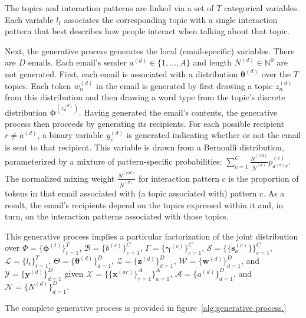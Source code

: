 \documentclass{pnastwo}
\newcommand{\bs}{\boldsymbol{s}}
\newcommand{\bw}{\boldsymbol{w}}
\newcommand{\bx}{\boldsymbol{x}}
\newcommand{\by}{\boldsymbol{y}}
\newcommand{\bz}{\boldsymbol{z}}
\newcommand{\bgamma}{\boldsymbol{\gamma}}
\newcommand{\bphi}{\boldsymbol{\phi}}
\newcommand{\btheta}{\boldsymbol{\theta}}
\begin{document}
\begin{article}
The topics and interaction patterns are linked via a set of $T$
categorical variables. Each variable $l_t$ associates the
corresponding topic with a single interaction pattern that best
describes how people interact when talking about that topic.

Next, the generative process generates the local (email-specific)
variables. There are $D$ emails. Each email's sender $a^{(d)} \in \{1,
\ldots, A\}$ and length $N^{(d)} \in \mathbb{N}^0$ are not
generated. First, each email is associated with a distribution
$\btheta^{(d)}$ over the $T$ topics. Each token $w_n^{(d)}$ in the
email is generated by first drawing a topic $z_n^{(d)}$ from this
distribution and then drawing a word type from the topic's discrete
distribution $\bphi^{(z_n^{(d)})}$. Having generated the email's
contents, the generative process then proceeds by generating its
recipients. For each possible recipient $r \neq a^{(d)}$, a binary
variable $y^{(d)}_r$ is generated indicating whether or not the email
is sent to that recipient. This variable is drawn from a Bernoulli
distribution, parameterized by a mixture of pattern-specific
probabilities: $\sum_{c=1}^C \frac{\bar{N}^{(c|d)}}{\bar{N}^{(d)}}
p^{(c)}_{a^{(d)}r}$. The normalized mixing weight
$\frac{\bar{N}^{(c|d)}}{\bar{N}^{(d)}}$ for interaction pattern $c$ is
the proportion of tokens in that email associated with (a topic
associated with) pattern $c$. As a result, the email's recipients
depend on the topics expressed within it and, in turn, on the
interaction patterns associated with those topics.

This generative process implies a particular factorization of the
joint distribution over $\Phi = \{ \bphi^{(t)} \}_{t=1}^T$,
$\mathcal{B} = \{ b^{(c)} \}_{c=1}^C$, $\Gamma = \{ \bgamma^{(c)}
\}_{c=1}^C$, $\mathcal{S} = \{ \{ \bs^{(c)}_a \} \}_{c=1}^C$,
$\mathcal{L} = \{ l_t\}_{t=1}^T$, $\Theta = \{ \btheta^{(d)}
\}_{d=1}^D$, $\mathcal{Z} = \{ \bz^{(d)} \}_{d=1}^D$, $\mathcal{W} =
\{ \bw^{(d)} \}_{d=1}^D$, and $\mathcal{Y} = \{ \by^{(d)} \}_{d=1}^D$
given $\mathcal{X} = \{ \{ \bx^{(ar)} \}_{r=1}^A \}_{a=1}^A$,
$\mathcal{A} = \{ a^{(d)} \}_{d=1}^D$, and $\mathcal{N} = \{ N^{(d)}
\}_{d=1}^D$.

The complete generative process is provided in
figure~\ref{alg:generative process.}


\end{article}
\end{document}
